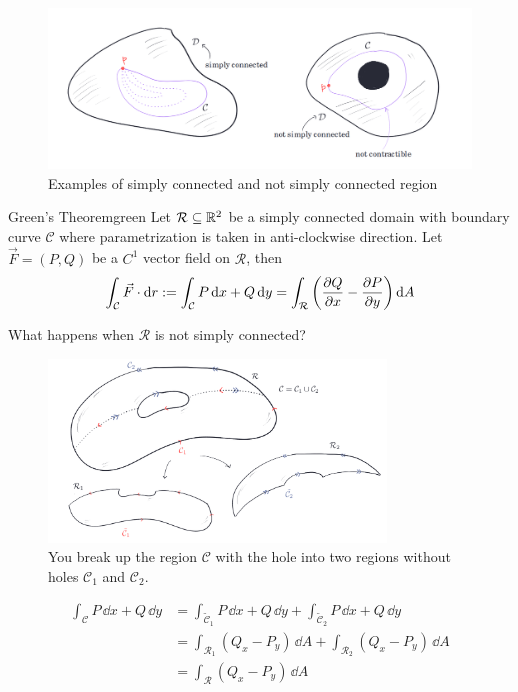 \documentclass[../Analysis-3.tex]{subfiles}
\begin{document}
\begin{figure}[h]
  \centering
  \includegraphics[width=\textwidth]{../figures/lec27.4.png}
  \caption{Examples of simply connected and not simply connected region}
  \label{fig4:27}
\end{figure}

\begin{Thm}{Green's Theorem}{green}
  Let $\mathcal{R} \subseteq \mathbb{R}^2 $ be a simply connected domain with boundary curve $\mathcal{C}$ where parametrization is taken in anti-clockwise direction. Let $\vec{F} = (P,Q)$ be a $C^1$ vector field on $\mathcal{R}$, then
  \[
    \int_{\mathcal{C}} \vec{F} \cdot \dd r := \int_{\mathcal{C}} P \, \dd x + Q \, \dd y = \int_{\mathcal{R}} \left( \pdv{Q}{x} - \pdv{P}{y}\right) \dd A
  \]
\end{Thm}

What happens when $\mathcal{R}$ is not simply connected?
\begin{figure}[H]
  \centering
  \includegraphics[width=0.8\textwidth]{../figures/lec27.5.png}
  \caption{You break up the region $\mathcal{C}$ with the hole into two regions without holes $\mathcal{C}_1$ and $\mathcal{C}_2$.}
  \label{fig5:27}
\end{figure}
\begin{align*}
  \int_{\mathcal{C}} P \, \dd x + Q \, \dd y
   & = \int_{\tilde{\mathcal{C}}_1} P \, \dd x + Q \, \dd y + \int_{\tilde{\mathcal{C}}_2} P \, \dd x + Q \, \dd y \\
   & = \int_{\mathcal{R}_1} (Q_x - P_y) \, \dd A + \int_{\mathcal{R}_2} (Q_x - P_y) \, \dd A                       \\
   & = \int_{\mathcal{R}} (Q_x - P_y) \, \dd A
\end{align*}
\end{document}

